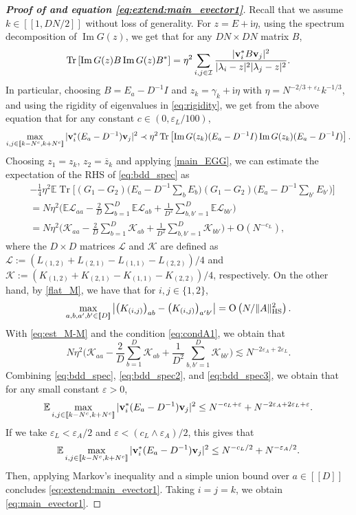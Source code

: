 \documentclass[10pt,reqno]{amsart}
\numberwithin{equation}{section}
\numberwithin{figure}{section}
\theoremstyle{plain} %
\theoremstyle{definition} %
\newcommand{\cal}{\mathcal}
\renewcommand{\txt}[1]{\text{\rm{#1}}}
\newcommand{\E}{\mathbb{E}}
\newcommand{\cI}{\mathcal{I}}
\newcommand{\ii}{\mathrm{i}}
\renewcommand{\bar}{\overline}
\newcommand{\qq}[1]{[\![{#1}]\!]}
\DeclareMathOperator{\tr}{\mathrm{Tr}}
\DeclareMathOperator{\im}{\mathrm{Im}}
\newcommand{\bv}{{\bf{v}}}
\newcommand{\be}{\begin{equation}}
\newcommand{\ee}{\end{equation}}
\newcommand{\e}{{\varepsilon}}
\newcommand{\OO}{\mathrm{O}}
\newcommand{\HS}{\txt{HS}}
\numberwithin{equation}{section}
\begin{document}
\begin{proof}[\bf Proof of  and equation \eqref{eq:extend:main_evector1}]

Recall that we assume $k\in\qq{1,DN/2}$ without loss of generality. For $z=E+\ii \eta$, using the spectrum decomposition of $\im G(z)$,
we get that for any $DN\times DN$ matrix $B$,
$$
\tr \left[ \im G (z) B\im G(z)  B^* \right]=\eta^2\sum_{i,j\in \cI}\frac{|\bv^*_i B \bv_j|^2}{|\lambda_i-z|^2 |\lambda_j-z|^2 }.
$$
In particular, choosing $B=E_{a}-D^{-1}I$ and $z_k=\gamma_k+\ii\eta$ with $\eta=N^{-2/3+\varepsilon_L}k^{-1/3}$,  and using the rigidity of eigenvalues in \eqref{eq:rigidity}, we get from the above equation that for any constant $c\in (0,\e_L/100)$, 
\be\label{eq:bdd_spec}
 \max_{i,j\in \qq{k-N^c,k+N^c}}|\bv^*_i (E_{a}-D^{-1}) \bv_j|^2 \prec \eta^2 \tr \left[ \im G (z_k) (E_{a}-D^{-1}I)\im G(z_k) (E_{a}-D^{-1}I) \right].
\ee
Choosing $z_1=z_k$, $z_2=\bar z_k$ and applying \eqref{main_EGG}, we can estimate the expectation of the RHS of \eqref{eq:bdd_spec} as
\begin{align}
   &-\frac{1}{4}\eta^2 \E\tr \Big[ (G_1-G_2)\Big(E_{a}-D^{-1}\sum_b E_b\Big)(G_1-G_2) \Big(E_{a}-D^{-1}\sum_{b'} E_{b'}\Big) \Big] \nonumber\\
   &=N\eta^2 \bigg(\E\cal L_{aa} - \frac{2}{D} \sum_{b=1}^D \E\cal L_{ab} + \frac{1}{D^2} \sum_{b,b'=1}^D \E\cal L_{bb'}\bigg)\nonumber\\
   &=N\eta^2 \bigg(\cal K_{aa} - \frac{2}{D} \sum_{b=1}^D \cal K_{ab} + \frac{1}{D^2} \sum_{b,b'=1}^D \cal K_{bb'}\bigg) + \OO\left(N^{-c_L}\right),\label{eq:bdd_spec2}
\end{align}
where the $D\times D$ matrices $\cal L$ and $\cal K$ are defined as $\cal L:=(L_{(1,2)}+L_{(2,1)}-L_{(1,1)}-L_{(2,2)})/4$ and $\cal K:=(K_{(1,2)}+K_{(2,1)}-K_{(1,1)}-K_{(2,2)})/4$, respectively. 
On the other hand, by \eqref{flat_M}, we have that for $i,j\in \{1,2\}$, 
\be\label{eq:est_M-M}
\max_{a,b,a',b'\in \qq D}\left|\left(K_{(i,j)}\right)_{ab}-\left(K_{(i,j)}\right)_{a'b'}\right|=\OO \left({N}/{\|A\|_{\HS}^2}\right).
\ee
With \eqref{eq:est_M-M} and the condition \eqref{eq:condA1}, we obtain that
\be\label{eq:bdd_spec3} N\eta^2 \bigg(\cal K_{aa} - \frac{2}{D} \sum_{b=1}^D \cal K_{ab} + \frac{1}{D^2} \sum_{b,b'=1}^D \cal K_{bb'}\bigg) \lesssim N^{-2\e_A + 2\e_L} .
\ee
Combining \eqref{eq:bdd_spec}, \eqref{eq:bdd_spec2}, and \eqref{eq:bdd_spec3}, we obtain that for any small constant $\e>0$, 
\be\label{eq:bdd_spec4} \E  \max_{i,j\in \qq{k-N^c,k+N^c}}|\bv^*_i (E_{a}-D^{-1}) \bv_j|^2 \le N^{-c_L +\e} +N^{-2\e_A + 2\varepsilon_L+\e}.
\ee
If we take $\varepsilon_L<\e_A/2$ and $\e< (c_L\wedge \e_A)/2$, this gives that 
$$ \E  \max_{i,j\in \qq{k-N^c,k+N^c}}|\bv^*_i (E_{a}-D^{-1}) \bv_j|^2 \le N^{-c_L/2} +N^{-\e_A/2}.$$
Then, applying Markov's inequality and a simple union bound over $a\in \qq D$ concludes \eqref{eq:extend:main_evector1}. Taking $i=j=k$, we obtain \eqref{eq:main_evector1}.
\end{proof}
\end{document}
